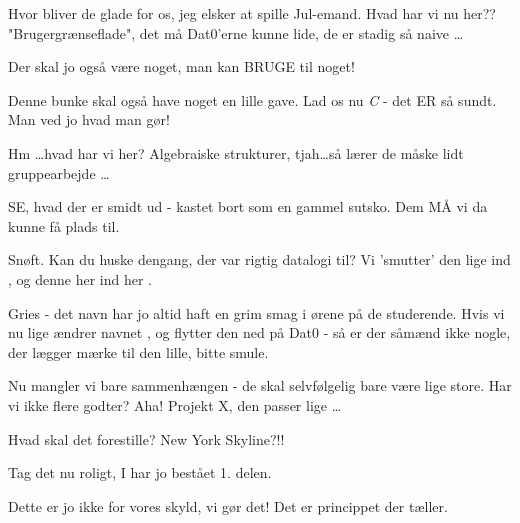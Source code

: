 \documentclass[a4paper,11pt]{article}
\begin{document}
\begin{sketch}
  Hvor bliver de glade for os, jeg elsker at spille Jul-emand.
           Hvad har vi nu her?? "Brugergrænseflade", det må Dat0'erne kunne lide, de er stadig så naive \ldots

  Der skal jo også være noget, man kan BRUGE til noget! 

 Denne bunke skal også have noget en lille gave. Lad os nu \emph{C} 
          - det ER så sundt.  Man ved jo hvad man gør!

 Hm \ldots hvad har vi her? Algebraiske strukturer, tjah\ldots så lærer de måske lidt gruppearbejde \ldots

 
          SE, hvad der er smidt ud - kastet bort som en gammel sutsko. Dem MÅ vi da kunne få plads til.

 Snøft.  Kan du huske dengang, der var rigtig datalogi til?
          Vi 'smutter' den lige ind , og denne her ind her .

  Gries - det navn har jo altid haft en grim smag i ørene på de studerende.
          Hvis vi nu lige ændrer navnet , og flytter den ned på Dat0 - så er der såmænd
          ikke nogle, der lægger mærke til den lille, bitte smule.

  Nu mangler vi bare sammenhængen -
          de skal selvfølgelig bare være lige store. Har vi ikke flere godter? 
          Aha! Projekt X, den passer lige \ldots


  Hvad skal det forestille? New York Skyline?!!

 Tag det nu roligt, I har jo bestået 1. delen.

 Dette er jo ikke for vores skyld, vi gør det! Det er princippet der tæller.


\end{sketch}
\end{document}
